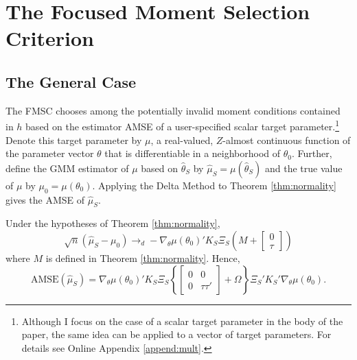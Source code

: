 \section{The Focused Moment Selection Criterion}
\label{sec:FMSC}

\subsection{The General Case}
The FMSC chooses among the potentially invalid moment conditions contained in $h$ based on the estimator AMSE of a user-specified scalar target parameter.\footnote{Although I focus on the case of a scalar target parameter in the body of the paper, the same idea can be applied to a vector of target parameters. For details see Online Appendix \ref{append:mult}.}
Denote this target parameter by $\mu$, a real-valued, $Z$-almost continuous function of the parameter vector $\theta$ that is differentiable in a neighborhood of $\theta_0$. 
Further, define the GMM estimator of $\mu$ based on $\widehat{\theta}_S$ by $\widehat{\mu}_S = \mu(\widehat{\theta}_S)$ and the true value of $\mu$ by $\mu_0 = \mu(\theta_0)$. 
Applying the Delta Method to Theorem \ref{thm:normality} gives the AMSE of $\widehat{\mu}_S$.

\begin{cor}
\label{cor:target}
Under the hypotheses of Theorem \ref{thm:normality}, 
$$\sqrt{n}\left(\widehat{\mu}_S - \mu_0\right)\rightarrow_d-\nabla_\theta\mu(\theta_0)'K_S \Xi_S \left(M +  \left[\begin{array}
	{c} 0 \\ \tau
\end{array} \right]\right)$$ 
where $M$ is defined in Theorem \ref{thm:normality}.
Hence,
	$$\mbox{AMSE}\left(\widehat{\mu}_S\right) = \nabla_\theta\mu(\theta_0)'K_S \Xi_S \left\{\left[\begin{array}{cc}0&0\\0&\tau\tau'\end{array}\right] + \Omega\right\}\Xi_S'K_S'\nabla_\theta\mu(\theta_0).$$
\end{cor}


